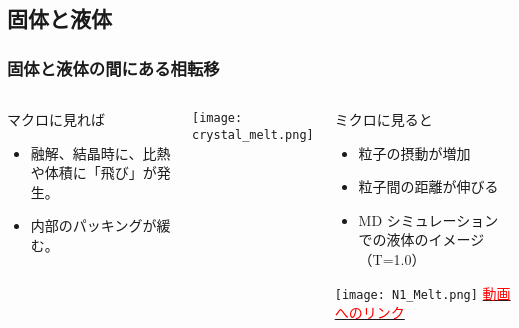 \documentclass[12pt, dvipdfmx]{beamer}
\begin{document}
\subsection{固体と液体}
\begin{frame}
	\frametitle{固体と液体の間にある相転移}
	\begin{columns}[T, onlytextwidth]
		\begin{block}{マクロに見れば}
			\begin{itemize}
				\item 融解、結晶時に、比熱や体積に「飛び」が発生。
				\item 内部のパッキングが緩む。
			\end{itemize}
		\end{block}
		\begin{center}
			\texttt{[image: crystal\_melt.png]}
		\end{center}
			\begin{exampleblock}{ミクロに見ると}
				\begin{itemize}
					\item 粒子の摂動が増加
					\item 粒子間の距離が伸びる
					\item MD シミュレーションでの液体のイメージ（T=1.0）
				\end{itemize}
				\begin{center}
					\texttt{[image: N1\_Melt.png]}
					\href{https://drive.google.com/file/d/1ceUaJomvBvljykBGIyLaRJXQbGJzlGUm/view?usp=sharing}{\textcolor{red}{動画へのリンク}}
				\end{center}
			\end{exampleblock}
	\end{columns}
\end{frame}
\end{document}
